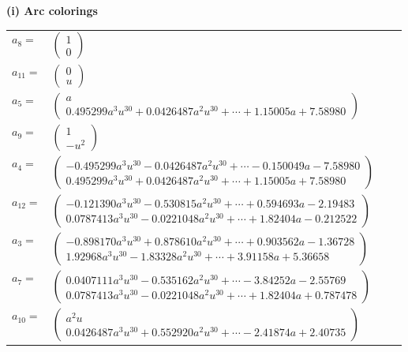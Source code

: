 \documentclass[1p]{elsarticle_modified}
\theoremstyle{definition}
\begin{document}
\flushleft \textbf{(i) Arc colorings}\\
\begin{tabular}{m{7pt} m{180pt} m{7pt} m{180pt} }
\flushright $a_{8}=$&$\begin{pmatrix}1\\0\end{pmatrix}$ \\
\flushright $a_{11}=$&$\begin{pmatrix}0\\u\end{pmatrix}$ \\
\flushright $a_{5}=$&$\begin{pmatrix}a\\0.495299 a^{3} u^{30}+0.0426487 a^{2} u^{30}+\cdots+1.15005 a+7.58980\end{pmatrix}$ \\
\flushright $a_{9}=$&$\begin{pmatrix}1\\- u^2\end{pmatrix}$ \\
\flushright $a_{4}=$&$\begin{pmatrix}-0.495299 a^{3} u^{30}-0.0426487 a^{2} u^{30}+\cdots-0.150049 a-7.58980\\0.495299 a^{3} u^{30}+0.0426487 a^{2} u^{30}+\cdots+1.15005 a+7.58980\end{pmatrix}$ \\
\flushright $a_{12}=$&$\begin{pmatrix}-0.121390 a^{3} u^{30}-0.530815 a^{2} u^{30}+\cdots+0.594693 a-2.19483\\0.0787413 a^{3} u^{30}-0.0221048 a^{2} u^{30}+\cdots+1.82404 a-0.212522\end{pmatrix}$ \\
\flushright $a_{3}=$&$\begin{pmatrix}-0.898170 a^{3} u^{30}+0.878610 a^{2} u^{30}+\cdots+0.903562 a-1.36728\\1.92968 a^{3} u^{30}-1.83328 a^{2} u^{30}+\cdots+3.91158 a+5.36658\end{pmatrix}$ \\
\flushright $a_{7}=$&$\begin{pmatrix}0.0407111 a^{3} u^{30}-0.535162 a^{2} u^{30}+\cdots-3.84252 a-2.55769\\0.0787413 a^{3} u^{30}-0.0221048 a^{2} u^{30}+\cdots+1.82404 a+0.787478\end{pmatrix}$ \\
\flushright $a_{10}=$&$\begin{pmatrix}a^2 u\\0.0426487 a^{3} u^{30}+0.552920 a^{2} u^{30}+\cdots-2.41874 a+2.40735\end{pmatrix}$ \\

\end{tabular}
\end{document}
